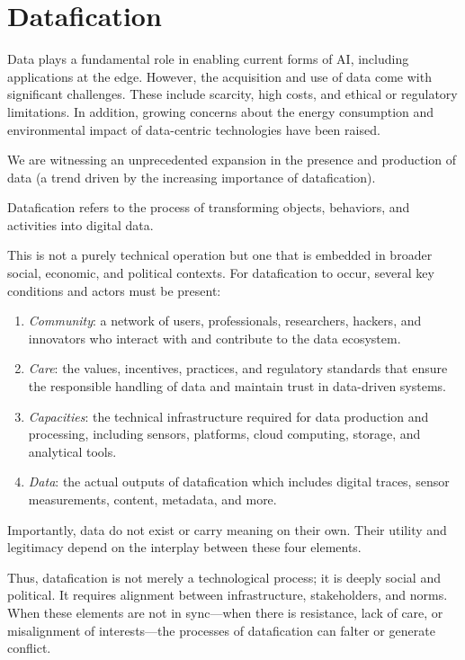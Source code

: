 \section{Datafication}

Data plays a fundamental role in enabling current forms of AI, including applications at the edge. However, the acquisition and use of data come with significant challenges. 
These include scarcity, high costs, and ethical or regulatory limitations. 
In addition, growing concerns about the energy consumption and environmental impact of data-centric technologies have been raised.

We are witnessing an unprecedented expansion in the presence and production of data (a trend driven by the increasing importance of datafication).
\begin{definition}
    Datafication refers to the process of transforming objects, behaviors, and activities into digital data.
\end{definition}
\noindent This is not a purely technical operation but one that is embedded in broader social, economic, and political contexts.
For datafication to occur, several key conditions and actors must be present:
\begin{enumerate}
    \item \textit{Community}: a network of users, professionals, researchers, hackers, and innovators who interact with and contribute to the data ecosystem.
    \item \textit{Care}: the values, incentives, practices, and regulatory standards that ensure the responsible handling of data and maintain trust in data-driven systems.
    \item \textit{Capacities}: the technical infrastructure required for data production and processing, including sensors, platforms, cloud computing, storage, and analytical tools.
    \item \textit{Data}: the actual outputs of datafication which includes digital traces, sensor measurements, content, metadata, and more.
\end{enumerate}
Importantly, data do not exist or carry meaning on their own. 
Their utility and legitimacy depend on the interplay between these four elements.

Thus, datafication is not merely a technological process; it is deeply social and political. 
It requires alignment between infrastructure, stakeholders, and norms. 
When these elements are not in sync—when there is resistance, lack of care, or misalignment of interests—the processes of datafication can falter or generate conflict.